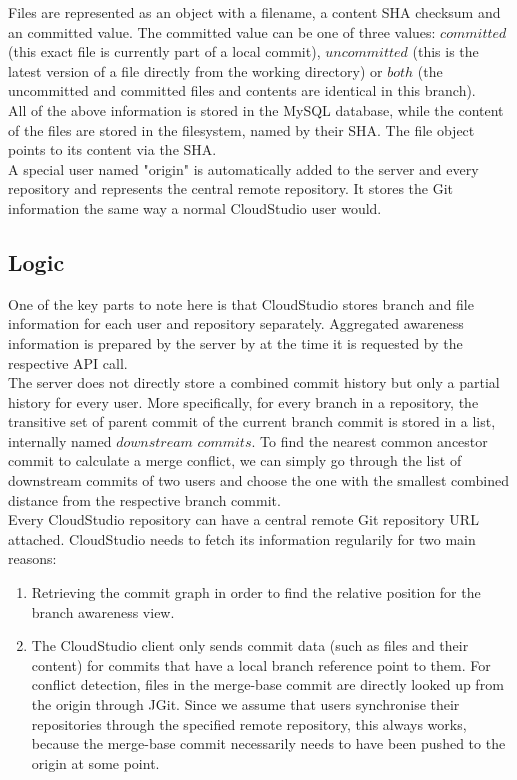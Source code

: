 Files are represented as an object with a filename, a content SHA checksum and an committed value. The committed value can be one of three values: $committed$ (this exact file is currently part of a local commit), $uncommitted$ (this is the latest version of a file directly from the working directory) or $both$ (the uncommitted and committed files and contents are identical in this branch). \\

All of the above information is stored in the MySQL database, while the content of the files are stored in the filesystem, named by their SHA. The file object points to its content via the SHA. \\

A special user named "origin" is automatically added to the server and every repository and represents the central remote repository. It stores the Git information the same way a normal CloudStudio user would.

\subsection{Logic}

One of the key parts to note here is that CloudStudio stores branch and file information for each user and repository separately. Aggregated awareness information is prepared by the server by at the time it is requested by the respective API call. \\

The server does not directly store a combined commit history but only a partial history for every user. More specifically, for every branch in a repository, the transitive set of parent commit of the current branch commit is stored in a list, internally named $downstream$ $commits$. To find the nearest common ancestor commit to calculate a merge conflict, we can simply go through the list of downstream commits of two users and choose the one with the smallest combined distance from the respective branch commit. \\

Every CloudStudio repository can have a central remote Git repository URL attached. CloudStudio needs to fetch its information regularily for two main reasons: \\

\begin{enumerate}
\item Retrieving the commit graph in order to find the relative position for the branch awareness view.
\item The CloudStudio client only sends commit data (such as files and their content) for commits that have a local branch reference point to them. For conflict detection, files in the merge-base commit are directly looked up from the origin through JGit. Since we assume that users synchronise their repositories through the specified remote repository, this always works, because the merge-base commit necessarily needs to have been pushed to the origin at some point.
\end{enumerate}

